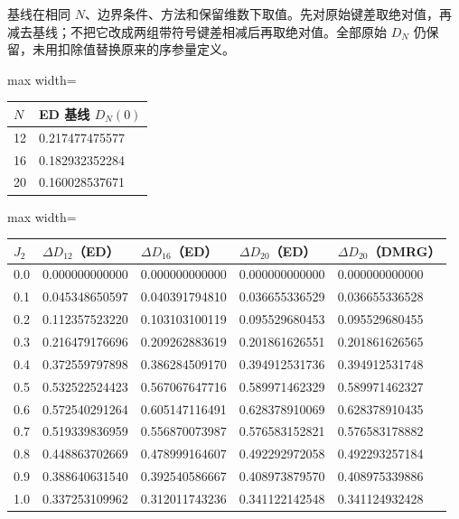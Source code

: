 \documentclass[zihao=5,a4paper]{ctexart}
\begin{document}
基线在相同 $N$、边界条件、方法和保留维数下取值。先对原始键差取绝对值，再减去基线；不把它改成两组带符号键差相减后再取绝对值。全部原始 $D_N$ 仍保留，未用扣除值替换原来的序参量定义。


\begin{center}
\small
\begin{adjustbox}{max width=\linewidth}
\begin{tabular}{ll}
\toprule
$N$ & ED 基线 $D_N(0)$ \\
\midrule
12 & 0.217477475577 \\
16 & 0.182932352284 \\
20 & 0.160028537671 \\
\bottomrule
\end{tabular}
\end{adjustbox}
\end{center}

\begin{center}
\small
\begin{adjustbox}{max width=\linewidth}
\begin{tabular}{lllll}
\toprule
$J_2$ & $\Delta D_{12}$（ED） & $\Delta D_{16}$（ED） & $\Delta D_{20}$（ED） & $\Delta D_{20}$（DMRG） \\
\midrule
0.0 & 0.000000000000 & 0.000000000000 & 0.000000000000 & 0.000000000000 \\
0.1 & 0.045348650597 & 0.040391794810 & 0.036655336529 & 0.036655336528 \\
0.2 & 0.112357523220 & 0.103103100119 & 0.095529680453 & 0.095529680455 \\
0.3 & 0.216479176696 & 0.209262883619 & 0.201861626551 & 0.201861626565 \\
0.4 & 0.372559797898 & 0.386284509170 & 0.394912531736 & 0.394912531748 \\
0.5 & 0.532522524423 & 0.567067647716 & 0.589971462329 & 0.589971462327 \\
0.6 & 0.572540291264 & 0.605147116491 & 0.628378910069 & 0.628378910435 \\
0.7 & 0.519339836959 & 0.556870073987 & 0.576583152821 & 0.576583178882 \\
0.8 & 0.448863702669 & 0.478999164607 & 0.492292972058 & 0.492293257184 \\
0.9 & 0.388640631540 & 0.392540586667 & 0.408973879570 & 0.408975339886 \\
1.0 & 0.337253109962 & 0.312011743236 & 0.341122142548 & 0.341124932428 \\
\bottomrule
\end{tabular}
\end{adjustbox}
\end{center}
\end{document}
